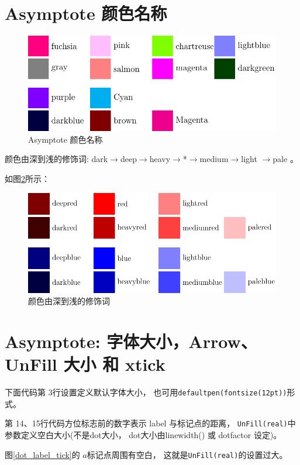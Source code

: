 \documentclass[a4paper,11pt]{article}
\begin{document}
\section{Asymptote 颜色名称}
\begin{figure}[htpb]
\centering
\includegraphics[scale=0.7]{./figs/asy_color.pdf}
\caption{Asymptote 颜色名称}
\label{fig:asy_color}
\end{figure}

颜色由深到浅的修饰词: dark$\to$deep$\to$heavy$\to$*$\to$medium$\to$light%
$\to$pale 。

如图\ref{fig:asy_color2}所示：
\begin{figure}[htpb]
\centering
\includegraphics[scale=0.7]{./figs/asy_color2.pdf}
\caption{颜色由深到浅的修饰词}
\label{fig:asy_color2}
\end{figure}

\section{Asymptote: 字体大小，Arrow、UnFill 大小 和 xtick}
下面代码第 3行设置定义默认字体大小，
也可用\verb+defaultpen(fontsize(12pt))+形式。

第 14、15行代码方位标志前的数字表示
label 与标记点的距离，
\verb+UnFill(real)+中参数定义空白大小(不是dot大小，
dot大小由linewidth() 或 dotfactor 设定)。

图\ref{dot_label_tick}的 $a$标记点周围有空白，
这就是\verb+UnFill(real)+的设置过大。
\end{document}
